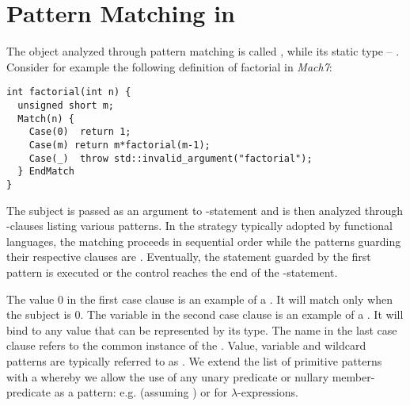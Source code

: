 \section{Pattern Matching in \Cpp{}} %
\label{sec:cpppat}



The object analyzed through pattern matching is called , while its 
static type -- .
Consider for example the following definition of factorial in \emph{Mach7}:

\begin{lstlisting}[keepspaces]
int factorial(int n) {
  unsigned short m;
  Match(n) {
    Case(0)  return 1;
    Case(m) return m*factorial(m-1);
    Case(_)  throw std::invalid_argument("factorial");
  } EndMatch
}
\end{lstlisting}

\noindent
The subject  is passed as an argument to -statement and is 
then analyzed through -clauses listing various patterns. In the 
 strategy typically adopted by functional languages, the 
matching proceeds in sequential order while the patterns guarding their 
respective clauses are . Eventually, the statement guarded by the 
first  pattern is executed or the control reaches the end of 
the -statement.

The value 0 in the first case clause is an example of a . It 
will match only when the subject  is 0. The variable  in the 
second case clause is an example of a . It will bind to 
any value that can be represented by its type. The name \code{_} in the last 
case clause refers to the common instance of the . Value, 
variable and wildcard patterns are typically referred to as . We extend the list of primitive patterns with a  whereby we allow the use of any unary predicate or nullary 
member-predicate as a pattern: e.g.  (assuming 
) or  for $\lambda$-expressions.

